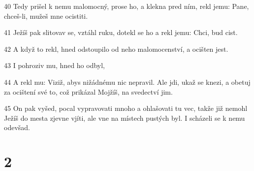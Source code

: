 \par 40 Tedy prišel k nemu malomocný, prose ho, a klekna pred ním, rekl jemu: Pane, chceš-li, mužeš mne ocistiti.
\par 41 Ježíš pak slitovav se, vztáhl ruku, dotekl se ho a rekl jemu: Chci, bud cist.
\par 42 A když to rekl, hned odstoupilo od neho malomocenství, a ocišten jest.
\par 43 I pohroziv mu, hned ho odbyl,
\par 44 A rekl mu: Viziž, abys nižádnému nic nepravil. Ale jdi, ukaž se knezi, a obetuj za ocištení své to, což prikázal Mojžíš, na svedectví jim.
\par 45 On pak vyšed, pocal vypravovati mnoho a ohlašovati tu vec, takže již nemohl Ježíš do mesta zjevne vjíti, ale vne na místech pustých byl. I scházeli se k nemu odevšad.

\chapter{2}

